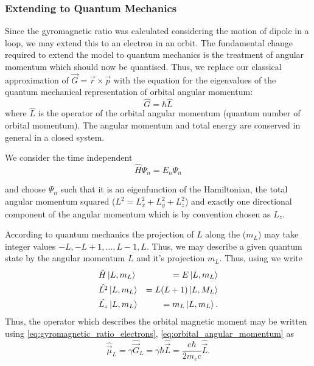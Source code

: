 \subsubsection{Extending to Quantum Mechanics}
Since the gyromagnetic ratio was calculated considering the motion of dipole in a loop, we may extend this to an electron in an orbit. The fundamental change required to extend the model to quantum mechanics is the treatment of angular momentum which should now be quantised. 
Thus, we replace our classical approximation of $\vec{G} = \vec{r} \times \vec{p}$ with the equation for the eigenvalues of the quantum mechanical representation of orbital angular momentum:
\begin{equation}
    \hat{G} = \hbar \hat{L} 
    \label{eq:orbital_angular_momentum}
\end{equation}
where $\hat{L}$ is the operator of the orbital angular momentum (quantum number of orbital momentum). 
The angular momentum and total energy are conserved in general in a closed system. 

We consider the time independent 
\begin{equation}
    \hat{H} \Psi_n = E_n \Psi_n 
    \label{eq:TISE}
\end{equation}

and choose $\Psi_n$ such that it is an eigenfunction of the Hamiltonian, the total angular momentum squared ($L^2 = L_x^2 + L_y^2 + L_z^2$) and exactly one directional component of the angular momentum which is by convention chosen as $L_z$.

According to quantum mechanics the projection of $L$ along the  ($m_L$) may take integer values $-L, -L + 1, \dots, L-1, L$.
Thus, we may describe a given quantum state by the angular momentum $L$ and it's projection $m_L$. Thus, using  we write 
\begin{eqnarray}
    &\hat{H}\ket{L, m_L} &= E\ket{L, m_L} \\ 
    &\hat{L^2}\ket{L, m_L} &= L(L+1)\ket{L, M_L} \\ 
    &\hat{L_z}\ket{L, m_L} &= m_L\ket{L, m_L}. \label{eq:zthcomponent} 
\end{eqnarray}
Thus, the operator which describes the orbital magnetic moment may be written using  \eqref{eq:gyromagnetic_ratio_electrons}, \eqref{eq:orbital_angular_momentum} as
\begin{equation}
    \hat{\vec{\mu}}_L = \gamma \hat{\vec{G}}_L = \gamma \hbar \hat{\vec{L}} = \frac{e\hbar}{2m_e c}\hat{\vec{L}}.
    \label{eq:orbital_magnetic_moment_operator}
\end{equation}


